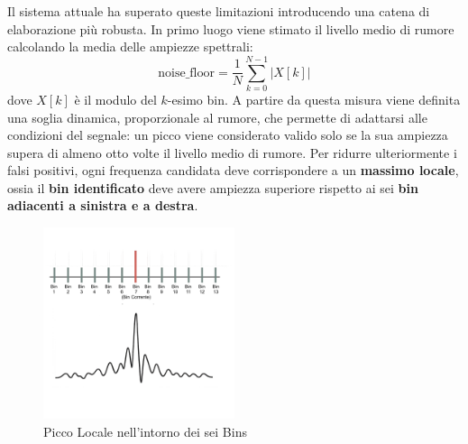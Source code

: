 Il sistema attuale ha superato queste limitazioni introducendo una catena di elaborazione più robusta.
 In primo luogo viene stimato il livello medio di rumore calcolando la media delle ampiezze spettrali:
\[
\text{noise\_floor} = \frac{1}{N}\sum_{k=0}^{N-1} |X[k]|
\]
dove $X[k]$ è il modulo del $k$-esimo bin. A partire da questa misura viene definita una soglia dinamica, 
proporzionale al rumore, che permette di adattarsi alle condizioni del segnale: un picco viene considerato 
valido solo se la sua ampiezza supera di almeno otto volte il livello medio di rumore. Per ridurre ulteriormente 
i falsi positivi, ogni frequenza candidata deve corrispondere a un \textbf{massimo locale}, ossia il \textbf{bin identificato}
 deve avere ampiezza superiore rispetto ai sei \textbf{bin adiacenti a sinistra e a destra}. \\
 \begin{figure}[H]
    \centering
    \includegraphics[width=0.5\textwidth]{immagini/local_peak.png}
    \caption{Picco Locale nell'intorno dei sei Bins}
    \label{fig:bins_local_peak}
\end{figure}
